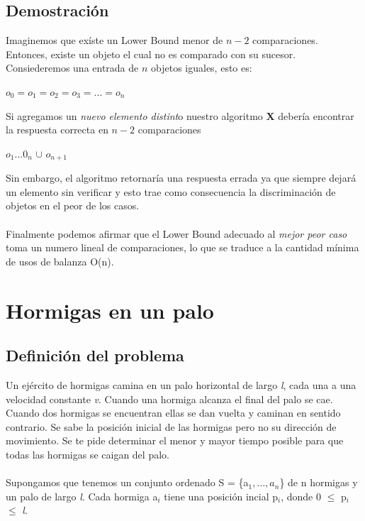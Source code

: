 \documentclass[11pt,spanish]{article}
\begin{document}
\subsection{Demostración}
Imaginemos que exíste un Lower Bound menor de $n-2$ comparaciones. Entonces, existe un objeto el cual no es comparado con su sucesor.\\Consiederemos una entrada de $n$ objetos iguales, esto es: 
\begin{center}$o_0 = o_1 = o_2 = o_3 = ... = o_n$\end{center}
Si agregamos un \emph{nuevo elemento distint}o nuestro algoritmo \textbf{X }debería encontrar la respuesta correcta en $n-2$ comparaciones\\
\begin{center}$o_1...0_n$ $\cup$ $o_{n+1}$\end{center}
Sin embargo, el algoritmo retornaría una respuesta errada ya que siempre dejará un elemento sin verificar y esto trae como consecuencia la discriminación de objetos en el peor de los casos.\\\\Finalmente podemos afirmar que el Lower Bound adecuado al \emph{mejor peor caso} toma un numero lineal de comparaciones, lo que se traduce a la cantidad mínima de usos de balanza O(n).
\newpage
\section{Hormigas en un palo}
\subsection{Definición del problema}
Un ejército de hormigas camina en un palo horizontal de largo \emph{l}, cada una a una velocidad constante \emph{v}. Cuando una hormiga alcanza el final del palo se cae. Cuando dos hormigas se encuentran ellas se dan vuelta y caminan en sentido contrario. Se sabe la posición inicial de las hormigas pero no su dirección de movimiento. Se te pide determinar el menor y mayor tiempo posible para que todas las hormigas se caigan del palo.\\\\Supongamos que tenemos un conjunto ordenado S = \{a$_{1}, \dots ,a_{n}$\} de n hormigas y un palo de largo \emph{l}. Cada hormiga a$_{i}$ tiene una posición incial p$_{i}$, donde 0 $\leq $ p$_{i}$ $\leq $ \emph{l}.
\end{document}
